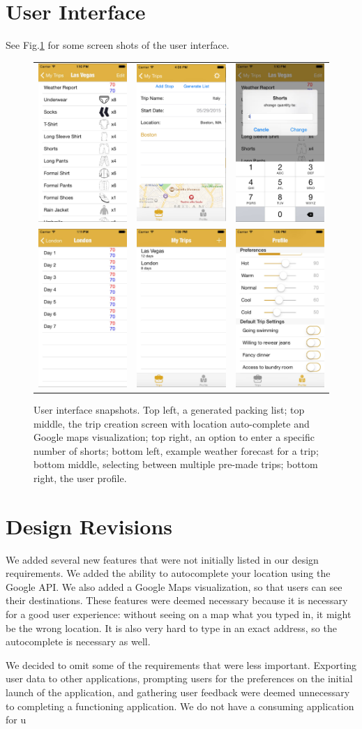\documentclass[11pt]{article}
\begin{document}
\section{User Interface}
See Fig.\ref{fig:ui} for some screen shots of the user interface.

\begin{figure}
    \centering
    \begin{tabular}{ccc}
    \includegraphics[scale=0.2]{img/ui-2.jpg} & \includegraphics[width=151pt]{img/ui-8.png} & \includegraphics[scale=0.2]{img/ui-7.jpg}\\
    \includegraphics[scale=0.2]{img/ui-5.jpg} & \includegraphics[scale=0.2]{img/ui-6.jpg} & \includegraphics[scale=0.2]{img/ui-4.jpg}
    \end{tabular}
    \caption{User interface snapshots. Top left, a generated packing list; top middle, the trip creation screen with location auto-complete and Google maps visualization; top right, an option to enter a specific number of shorts; bottom left, example weather forecast for a trip; bottom middle, selecting between multiple pre-made trips; bottom right, the user profile.}
    \label{fig:ui}
\end{figure}

\section{Design Revisions}
We added several new features that were not initially listed in our design requirements. We added the ability to autocomplete your location using the Google API. We also added a Google Maps visualization, so that users can see their destinations. These features were deemed necessary because it is necessary for a good user experience: without seeing on a map what you typed in, it might be the wrong location. It is also very hard to type in an exact address, so the autocomplete is necessary as well.

We decided to omit some of the requirements that were less important. Exporting user data to other applications, prompting users for the preferences on the initial launch of the application, and gathering user feedback were deemed unnecessary to completing a functioning application. We do not have a consuming application for u
\end{document}
